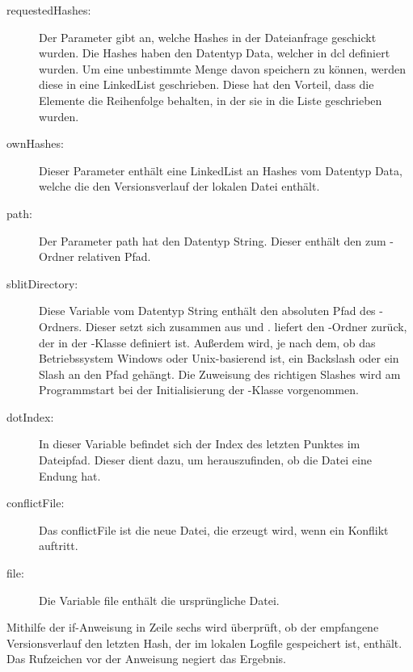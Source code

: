 \begin{description}
	\item[{requestedHashes:}] Der Parameter gibt an, welche Hashes in der Dateianfrage geschickt wurden. Die Hashes haben den Datentyp Data, welcher in \gls{dcl} definiert wurden. Um eine unbestimmte Menge davon speichern zu können, werden diese in eine LinkedList geschrieben. Diese hat den Vorteil, dass die Elemente die Reihenfolge behalten, in der sie in die Liste geschrieben wurden.
	
	\item[{ownHashes:}] Dieser Parameter enthält eine LinkedList an Hashes vom Datentyp Data, welche die den Versionsverlauf der lokalen Datei enthält. 
	
	\item[{path:}] Der Parameter path hat den Datentyp String. Dieser enthält den zum \sblit-Ordner relativen Pfad.
	
	\item[{sblitDirectory:}] Diese Variable vom Datentyp String enthält den absoluten Pfad des \sblit-Ordners. Dieser setzt sich zusammen aus  und .  liefert den \sblit-Ordner zurück, der in der -Klasse definiert ist. Außerdem wird, je nach dem, ob das Betriebssystem Windows oder Unix-basierend ist, ein Backslash oder ein Slash an den Pfad gehängt. Die Zuweisung des richtigen Slashes wird am Programmstart bei der Initialisierung der -Klasse vorgenommen.

	\item[{dotIndex:}] In dieser Variable befindet sich der Index des letzten Punktes im Dateipfad. Dieser dient dazu, um herauszufinden, ob die Datei eine Endung hat.
	
	\item[{conflictFile:}] Das conflictFile ist die neue Datei, die erzeugt wird, wenn ein Konflikt auftritt.
	
	\item[{file:}] Die Variable file enthält die ursprüngliche Datei.
\end{description}
Mithilfe der if-Anweisung in Zeile sechs wird überprüft, ob der empfangene Versionsverlauf den letzten Hash, der im lokalen Logfile gespeichert ist, enthält. Das Rufzeichen vor der Anweisung negiert das Ergebnis. 
